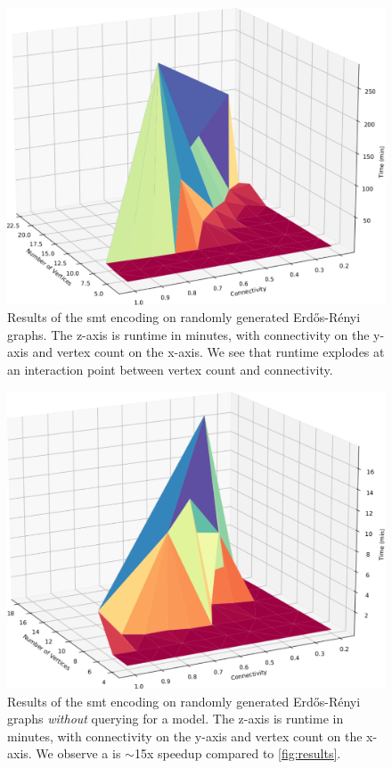 \label{section:results-and-discussion}
%
\begin{figure}[ht]
    \centering
    \includegraphics[width=1\linewidth]{Figures/big_ol_cliff}
    \caption{Results of the \ac{smt} encoding on randomly generated
      Erd\H{o}s-R\'{e}nyi graphs. The z-axis is runtime in minutes, with
      connectivity on the y-axis and vertex count on the x-axis. We see that
      runtime explodes at an interaction point between vertex count and
      connectivity.}%
    \label{fig:results}
\end{figure}%
%
\begin{figure}[ht]
  \centering
  \includegraphics[width=1\linewidth]{Figures/small_ol_cliff}
  \caption{Results of the \ac{smt} encoding on randomly generated
    Erd\H{o}s-R\'{e}nyi graphs \emph{without} querying for a model. The z-axis
    is runtime in minutes, with connectivity on the y-axis and vertex count on
    the x-axis. We observe a is $\sim$15x speedup compared to
    \autoref{fig:results}.}%
  \label{fig:results-no-model}
\end{figure}%

